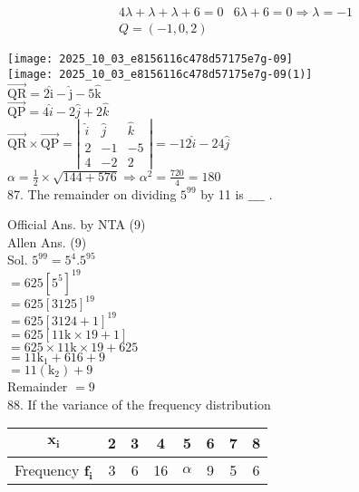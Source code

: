 \documentclass[10pt]{article}
\begin{document}
\[
\begin{array}{ll}
4 \lambda+\lambda+\lambda+6=0 & 6 \lambda+6=0 \Rightarrow \lambda=-1 \\
Q=(-1,0,2) &
\end{array}
\]

\texttt{[image: 2025\_10\_03\_e8156116c478d57175e7g-09]}\\
\texttt{[image: 2025\_10\_03\_e8156116c478d57175e7g-09(1)]}\\
\(\overrightarrow{\mathrm{QR}}=2 \hat{\mathrm{i}}-\hat{\mathrm{j}}-5 \hat{\mathrm{k}}\)\\
\(\overrightarrow{\mathrm{QP}}=4 \hat{i}-2 \hat{j}+2 \hat{k}\)\\
\(\overrightarrow{\mathrm{QR}} \times \overrightarrow{\mathrm{QP}}=\left|\begin{array}{ccc}\hat{i} & \hat{j} & \hat{k} \\ 2 & -1 & -5 \\ 4 & -2 & 2\end{array}\right|=-12 \hat{i}-24 \hat{j}\)\\
\(\alpha=\frac{1}{2} \times \sqrt{144+576} \Rightarrow \alpha^{2}=\frac{720}{4}=180\)\\
87. The remainder on dividing \(5^{99}\) by 11 is \(\_\_\_\_\) .

Official Ans. by NTA (9)\\
Allen Ans. (9)\\
Sol. \(5^{99}=5^{4} .5^{95}\)\\
\(=625\left[5^{5}\right]^{19}\)\\
\(=625[3125]^{19}\)\\
\(=625[3124+1]^{19}\)\\
\(=625[11 \mathrm{k} \times 19+1]\)\\
\(=625 \times 11 \mathrm{k} \times 19+625\)\\
\(=11 \mathrm{k}_{1}+616+9\)\\
\(=11\left(\mathrm{k}_{2}\right)+9\)\\
Remainder \(=9\)\\
88. If the variance of the frequency distribution

\begin{center}
\begin{tabular}{|c|c|c|c|c|c|c|c|}
\hline
\(\mathbf{x}_{\mathbf{i}}\) & 2 & 3 & 4 & 5 & 6 & 7 & 8 \\
\hline
Frequency \(\mathbf{f}_{\mathbf{i}}\) & 3 & 6 & 16 & \(\alpha\) & 9 & 5 & 6 \\
\hline
\end{tabular}
\end{center}
\end{document}

